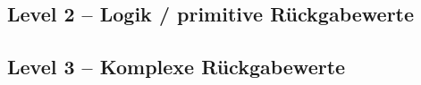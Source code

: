     \begin{figure}[H]
      \centering
      
      \label{fig:top_pack_uml}
    \end{figure}

    \begin{figure}[H]
      \centering
      
      \label{fig:parser_pack_uml}
    \end{figure}

    \begin{figure}[H]
      \centering
      
      \label{fig:AST_uml}
    \end{figure}


    \begin{figure}[H]
      \centering
      
      \label{fig:Scope_uml}
    \end{figure}

    \begin{figure}[H]
      \centering
      
      \label{fig:Condition_uml}
    \end{figure}

    \begin{figure}[H]
      \centering
      
      \label{fig:interpreter_pack_uml}
    \end{figure}

  \subsection{Level 2 -- Logik / primitive Rückgabewerte}
  \label{ssec:Level 2 -- Logik / primitive Rückgabewerte}

  \subsection{Level 3 -- Komplexe Rückgabewerte}
  \label{ssec:Level 3 -- Komplexe Rückgabewerte}

